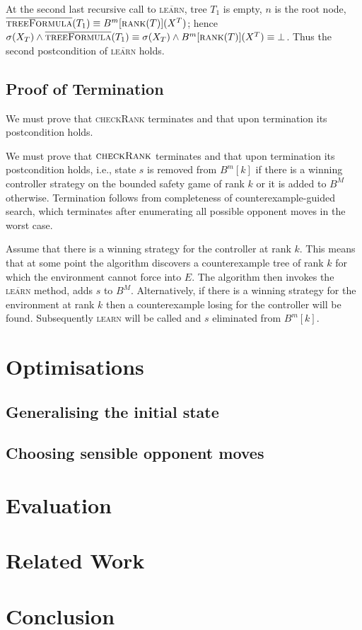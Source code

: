 \documentclass{llncs}
\newcommand{\textoverline}[1]{$\overline{\mbox{#1}}$}
\begin{document}
At the second last recursive call to \textsc{\textoverline{learn}}, tree $T_1$
is empty, $n$ is the root node, $\textsc{\textoverline{treeFormula}}(T_1)
\equiv B^m[\textsc{rank}(T)](X^T)$; hence $\sigma(X_T) \land
\textsc{\textoverline{treeFormula}}(T_1) \equiv \sigma(X_T) \land
B^m[\textsc{rank}(T)](X^T) \equiv \bot$.  Thus the second postcondition of
\textsc{\textoverline{learn}} holds.

\subsection{Proof of Termination}

We must prove that \textsc{checkRank} terminates and that upon termination its
postcondition holds.

We must prove that $\textsc{checkRank}$ terminates and that upon termination
its postcondition holds, i.e., state $s$ is removed from $B^m[k]$ if there is a
winning controller strategy on the bounded safety game of rank $k$ or it is
added to $B^M$ otherwise. Termination follows from completeness of
counterexample-guided search, which terminates after enumerating all possible
opponent moves in the worst case.

Assume that there is a winning strategy for the controller at rank $k$. This
means that at some point the algorithm discovers a counterexample tree of rank
$k$ for which the environment cannot force into $E$. The algorithm then invokes
the \textsc{\textoverline{learn}} method, adds $s$ to $B^M$.  Alternatively, if
there is a winning strategy for the environment at rank $k$ then a
counterexample losing for the controller will be found. Subsequently
\textsc{learn} will be called and $s$ eliminated from $B^m[k]$.

\section{Optimisations}

\subsection{Generalising the initial state}

\subsection{Choosing sensible opponent moves}

\section{Evaluation}

\section{Related Work}

\section{Conclusion}




\end{document}
